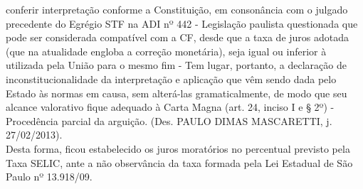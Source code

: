 conferir interpretação conforme a Constituição, em consonância com o julgado precedente do Egrégio STF na ADI nº 442 - Legislação paulista questionada que pode ser considerada compatível com a CF, desde que a taxa de juros adotada (que na atualidade engloba a correção monetária), seja igual ou inferior à utilizada pela União para o mesmo fim - Tem lugar, portanto, a declaração de inconstitucionalidade da interpretação e aplicação que vêm sendo dada pelo Estado às normas em causa, sem alterá-las gramaticalmente, de modo que seu alcance valorativo fique adequado à Carta Magna (art. 24, inciso I e § 2º) - Procedência parcial da arguição. (Des. PAULO DIMAS MASCARETTI, j. 27/02/2013).
\[\]
Desta forma, ficou estabelecido os juros moratórios no percentual previsto pela Taxa SELIC, ante a não observância da taxa formada pela Lei Estadual de São Paulo nº 13.918/09.